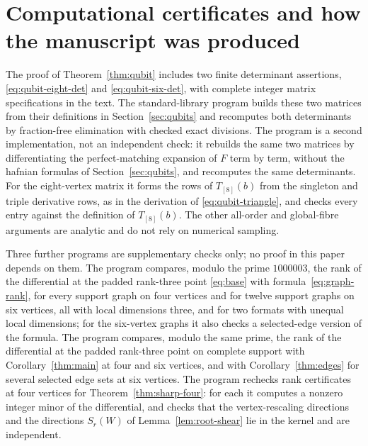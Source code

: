 \documentclass[11pt]{article}
\theoremstyle{remark}\newtheorem{remark}[theorem]{Remark}
\begin{document}
\section*{Computational certificates and how the manuscript was produced}
The proof of Theorem~\ref{thm:qubit} includes two finite determinant assertions, \eqref{eq:qubit-eight-det} and \eqref{eq:qubit-six-det}, with complete integer matrix specifications in the text. The standard-library program  builds these two matrices from their definitions in Section~\ref{sec:qubits} and recomputes both determinants by fraction-free elimination with checked exact divisions. The program  is a second implementation, not an independent check: it rebuilds the same two matrices by differentiating the perfect-matching expansion of $F$ term by term, without the hafnian formulas of Section~\ref{sec:qubits}, and recomputes the same determinants. For the eight-vertex matrix it forms the rows of $T_{[8]}(b)$ from the singleton and triple derivative rows, as in the derivation of \eqref{eq:qubit-triangle}, and checks every entry against the definition of $T_{[8]}(b)$. The other all-order and global-fibre arguments are analytic and do not rely on numerical sampling.

Three further programs are supplementary checks only; no proof in this paper depends on them. The program  compares, modulo the prime $1000003$, the rank of the differential at the padded rank-three point \eqref{eq:base} with formula~\eqref{eq:graph-rank}, for every support graph on four vertices and for twelve support graphs on six vertices, all with local dimensions three, and for two formats with unequal local dimensions; for the six-vertex graphs it also checks a selected-edge version of the formula. The program  compares, modulo the same prime, the rank of the differential at the padded rank-three point on complete support with Corollary~\ref{thm:main} at four and six vertices, and with Corollary~\ref{thm:edges} for several selected edge sets at six vertices. The program  rechecks rank certificates at four vertices for Theorem~\ref{thm:sharp-four}: for each it computes a nonzero integer minor of the differential, and checks that the vertex-rescaling directions and the directions $S_r(W)$ of Lemma~\ref{lem:root-shear} lie in the kernel and are independent.
\end{document}
